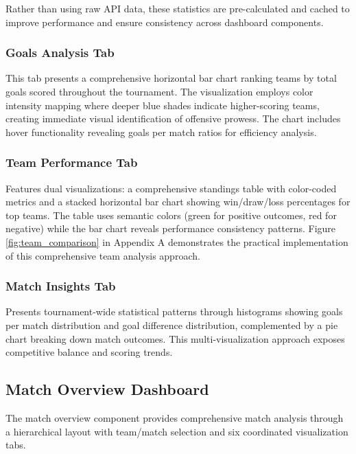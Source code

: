 \documentclass[12pt,a4paper]{article}
\begin{document}
Rather than using raw API data, these statistics are pre-calculated and cached to improve performance and ensure consistency across dashboard components.

\subsubsection{Goals Analysis Tab}
This tab presents a comprehensive horizontal bar chart ranking teams by total goals scored throughout the tournament. The visualization employs color intensity mapping where deeper blue shades indicate higher-scoring teams, creating immediate visual identification of offensive prowess. The chart includes hover functionality revealing goals per match ratios for efficiency analysis.


\subsubsection{Team Performance Tab}
Features dual visualizations: a comprehensive standings table with color-coded metrics and a stacked horizontal bar chart showing win/draw/loss percentages for top teams. The table uses semantic colors (green for positive outcomes, red for negative) while the bar chart reveals performance consistency patterns. Figure \ref{fig:team_comparison} in Appendix A demonstrates the practical implementation of this comprehensive team analysis approach.


\subsubsection{Match Insights Tab}
Presents tournament-wide statistical patterns through histograms showing goals per match distribution and goal difference distribution, complemented by a pie chart breaking down match outcomes. This multi-visualization approach exposes competitive balance and scoring trends.



\subsection{Match Overview Dashboard}
\label{sec:match_overview}

The match overview component provides comprehensive match analysis through a hierarchical layout with team/match selection and six coordinated visualization tabs. 
\end{document}
